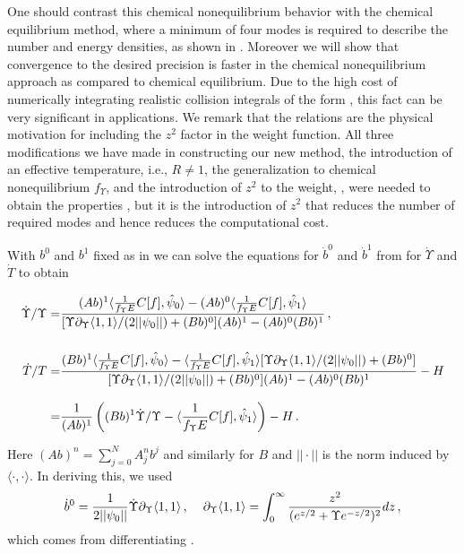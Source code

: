 One should contrast this chemical nonequilibrium behavior  with the chemical equilibrium method, where a minimum of four modes is required to describe the number and energy densities, as shown in .   Moreover we will show that convergence to the desired precision is faster in the chemical nonequilibrium approach as compared to chemical equilibrium. Due to the high cost of numerically integrating realistic collision integrals of the form , this fact can be very significant in applications. We remark that the relations  are the physical motivation for including the $z^2$ factor in the weight function. All three modifications we have made in constructing our new method, the introduction of an effective temperature, i.e., $R\ne 1$, the generalization to chemical nonequilibrium $f_\Upsilon $, and the introduction of $z^2$ to the weight, , were needed to obtain the properties , but it is the introduction of $z^2$ that reduces the number of required modes and hence reduces the computational cost. 

With $b^0$ and $b^1$ fixed as in  we can solve the equations for $\dot b^0$ and $\dot b^1$ from  for $\dot\Upsilon$ and $\dot T$ to obtain

\begin{align}\label{Ups_T_eqs}
\dot{\Upsilon}/{\Upsilon}=&\frac{(Ab)^1\langle\frac{1}{f_\Upsilon E}C[f],\hat\psi_0\rangle-(Ab)^0\langle\frac{1}{f_\Upsilon E}C[f],\hat\psi_1\rangle }{[\Upsilon\partial_\Upsilon \langle1,1\rangle/(2||\psi_0||)+(Bb)^0](Ab)^1-(Ab)^0(Bb)^1}\,,\\[0.5cm]
\dot{T}/T
=&\frac{(Bb)^1\langle\frac{1}{f_\Upsilon E}C[f],\hat\psi_0\rangle-\langle\frac{1}{f_\Upsilon E}C[f],\hat\psi_1\rangle[\Upsilon\partial_\Upsilon \langle1,1\rangle/(2||\psi_0||)+(Bb)^0]}{[\Upsilon\partial_\Upsilon \langle1,1\rangle/(2||\psi_0||)+(Bb)^0](Ab)^1-(Ab)^0(Bb)^1}-H\notag\\[0.3cm]
=&\frac{1}{(Ab)^1}\left((Bb)^1\dot{\Upsilon}/\Upsilon-\langle\frac{1}{f_\Upsilon E}C[f],\hat\psi_1\rangle\right)-H\,.\label{T_eq}
\end{align}

Here $(Ab)^n=\sum_{j=0}^NA^n_jb^j$ and similarly for $B$ and $||\cdot||$ is the norm induced by $\langle\cdot,\cdot\rangle$. In deriving this, we used
\begin{equation}
\dot{b}^0=\frac{1}{2||\psi_0||}\dot\Upsilon\partial_\Upsilon \langle1,1\rangle\,, \hspace{4mm} \partial_\Upsilon \langle1,1\rangle=\int_0^\infty \frac{z^2}{(e^{z/2}+ \Upsilon e^{-z/2})^2}dz\,,
\end{equation}
which comes from differentiating . 
 
